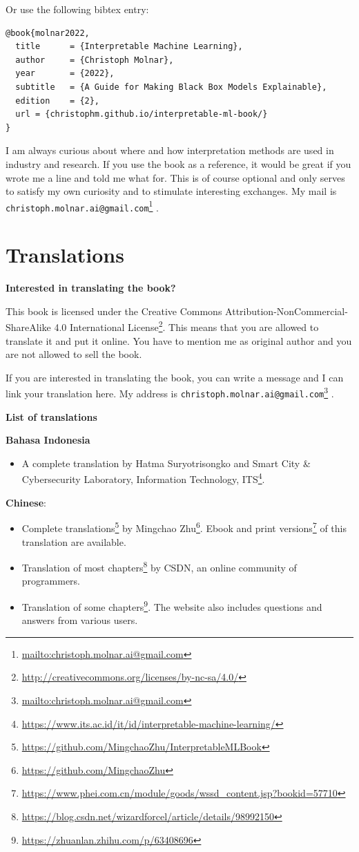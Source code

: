 \documentclass[
  10pt,
]{scrbook}
\providecommand{\tightlist}{%
  \setlength{\itemsep}{0pt}\setlength{\parskip}{0pt}}
\renewcommand{\href}[2]{#2\footnote{\url{#1}}}
\begin{document}
Or use the following bibtex entry:

\begin{verbatim}
@book{molnar2022,
  title      = {Interpretable Machine Learning},
  author     = {Christoph Molnar},
  year       = {2022},
  subtitle   = {A Guide for Making Black Box Models Explainable},
  edition    = {2},
  url = {christophm.github.io/interpretable-ml-book/}
}
\end{verbatim}

I am always curious about where and how interpretation methods are used in industry and research.
If you use the book as a reference, it would be great if you wrote me a line and told me what for.
This is of course optional and only serves to satisfy my own curiosity and to stimulate interesting exchanges.
My mail is \href{mailto:christoph.molnar.ai@gmail.com}{\nolinkurl{christoph.molnar.ai@gmail.com}} .

\hypertarget{translations}{%
\chapter{Translations}\label{translations}}

\textbf{Interested in translating the book?}

This book is licensed under the \href{http://creativecommons.org/licenses/by-nc-sa/4.0/}{Creative Commons Attribution-NonCommercial-ShareAlike 4.0 International License}.
This means that you are allowed to translate it and put it online.
You have to mention me as original author and you are not allowed to sell the book.

If you are interested in translating the book, you can write a message and I can link your translation here.
My address is \href{mailto:christoph.molnar.ai@gmail.com}{\nolinkurl{christoph.molnar.ai@gmail.com}} .

\textbf{List of translations}

\textbf{Bahasa Indonesia}

\begin{itemize}
\tightlist
\item
  \href{https://www.its.ac.id/it/id/interpretable-machine-learning/}{A complete translation by Hatma Suryotrisongko and Smart City \& Cybersecurity Laboratory, Information Technology, ITS}.
\end{itemize}

\textbf{Chinese}:

\begin{itemize}
\tightlist
\item
  \href{https://github.com/MingchaoZhu/InterpretableMLBook}{Complete translations} by \href{https://github.com/MingchaoZhu}{Mingchao Zhu}. \href{https://www.phei.com.cn/module/goods/wssd_content.jsp?bookid=57710}{Ebook and print versions} of this translation are available.
\item
  \href{https://blog.csdn.net/wizardforcel/article/details/98992150}{Translation of most chapters} by CSDN, an online community of programmers.
\item
  \href{https://zhuanlan.zhihu.com/p/63408696}{Translation of some chapters}. The website also includes questions and answers from various users.
\end{itemize}
\end{document}
